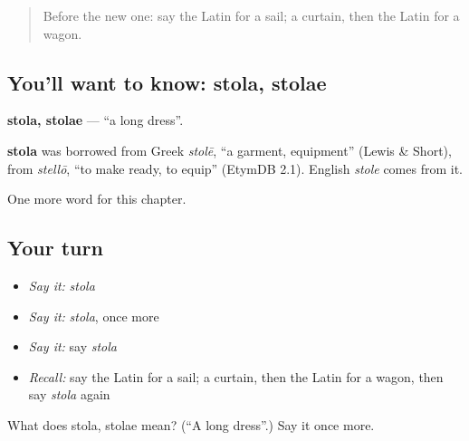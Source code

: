 \label{lesson:LA-C125-stola}



\begin{quote}
Before the new one: say the Latin for a sail; a curtain, then the Latin for a wagon.
\end{quote}

\subsection*{You'll want to know: stola, stolae}
\textbf{stola, stolae} — \textquotedblleft{}a long dress\textquotedblright{}.

\begin{cousinweb}
\textbf{stola} was borrowed from Greek \emph{stolē}, \textquotedblleft{}a garment, equipment\textquotedblright{} (Lewis \& Short), from \emph{stellō}, \textquotedblleft{}to make ready, to equip\textquotedblright{} (EtymDB 2.1). English \emph{stole} comes from it.
\end{cousinweb}

\begin{grammarlens}[title={What you've built}]
One more word for this chapter.
\end{grammarlens}

\subsection*{Your turn}
\begin{itemize}
\raggedright
  \item \emph{Say it:} \emph{stola}
  \item \emph{Say it:} \emph{stola}, once more
  \item \emph{Say it:} say \emph{stola}
  \item \emph{Recall:} say the Latin for a sail; a curtain, then the Latin for a wagon, then say \emph{stola} again
\end{itemize}

\begin{tcolorbox}[breakable,colback=teal!4,colframe=teal!35!black,title={Before you move on}]
What does stola, stolae mean? (\textquotedblleft{}A long dress\textquotedblright{}.) Say it once more.
\end{tcolorbox}
